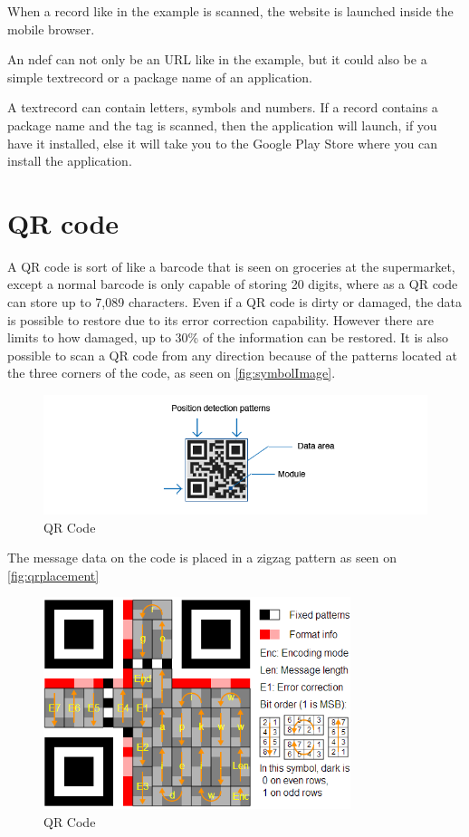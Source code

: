 When a record like in the example is scanned, the website is launched inside the mobile browser. 

An \ac{ndef} can not only be an URL like in the example, but it could also be a simple textrecord or a package name of an application. 

A textrecord can contain letters, symbols and numbers. If a record contains a package name and the tag is scanned, then the application will launch, if you have it installed, else it will take you to the Google Play Store where you can install the application. 

\section*{QR code}

A QR code is sort of like a barcode that is seen on groceries at the supermarket, except a normal barcode is only capable of storing 20 digits, where as a QR code can store up to 7,089 characters. Even if a QR code is dirty or damaged, the data is possible to restore due to its error correction capability. However there are limits to how damaged, up to 30\% of the information can be restored. It is also possible to scan a QR code from any direction  because of the patterns located at the three corners of the code, as seen on \autoref{fig:symbolImage}. \citep{qrcode}

\begin{figure}[H]
\centering
\includegraphics[width=1.5\textwidth]{img/symbolImage.png}
\caption{QR Code\citep{qrcode}}
\label{fig:symbolImage}
\end{figure}

The message data on the code is placed in a zigzag pattern as seen on \autoref{fig:qrplacement} 

\begin{figure}[H]
\centering
\includegraphics[width=0.8\textwidth]{img/qrplacement.png}
\caption{QR Code\citep{qrcode}}
\label{fig:qrplacement}
\end{figure}


